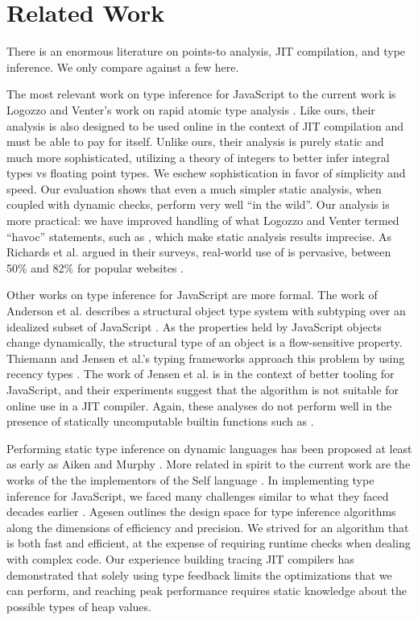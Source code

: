 \section{Related Work}
\label{sec:related-work}

There is an enormous literature on points-to analysis, JIT compilation, and
type inference. We only compare against a few here.

The most relevant work on type inference for JavaScript to the current work is
Logozzo and Venter's work on rapid atomic type analysis \cite{Logozzo10}.
Like ours, their analysis is also designed to be used online in the context of
JIT compilation and must be able to pay for itself. Unlike ours, their
analysis is purely static and much more sophisticated, utilizing a theory of
integers to better infer integral types vs floating point types. We eschew
sophistication in favor of simplicity and speed. Our evaluation shows that
even a much simpler static analysis, when coupled with dynamic checks, perform
very well ``in the wild''.
Our analysis is more
practical: we have improved handling of what Logozzo and Venter termed ``havoc''
statements, such as , which make static analysis results
imprecise. As Richards et al. argued in their surveys, real-world use of
 is pervasive, between 50\% and 82\% for popular websites
\cite{Richards11, Richards10}.

Other works on type inference for JavaScript are more formal. The work of
Anderson et al. describes a structural object type system with subtyping over
an idealized subset of JavaScript \cite{Anderson05}. As the properties held
by JavaScript objects change dynamically,
the structural type of an object is a flow-sensitive property. Thiemann
and Jensen et al.'s typing frameworks approach this problem by using recency
types \cite{Thiemann05, Jensen09}. The work of Jensen et al. is in the context
of better tooling for JavaScript, and their experiments suggest that the
algorithm is not suitable for online use in a JIT compiler. Again, these
analyses do not perform well in the presence of statically uncomputable
builtin functions such as .

Performing static type inference on dynamic languages has been proposed at
least as early as Aiken and Murphy \cite{Aiken91}. More related in spirit to
the current work are the works of the the implementors of the Self language
\cite{Ungar87}. In implementing type inference for JavaScript, we faced many
challenges similar to what they faced decades earlier \cite{Ungar92,
  Agesen94}. Agesen outlines the design space for type inference algorithms
along the dimensions of efficiency and precision. We strived for an
algorithm that is both fast and efficient, at the expense of requiring
runtime checks when dealing with complex code.
Our experience building tracing JIT compilers \cite{GalPLDI09} has
demonstrated that solely using type feedback limits the optimizations that we
can perform, and reaching peak performance requires static knowledge about
the possible types of heap values.

